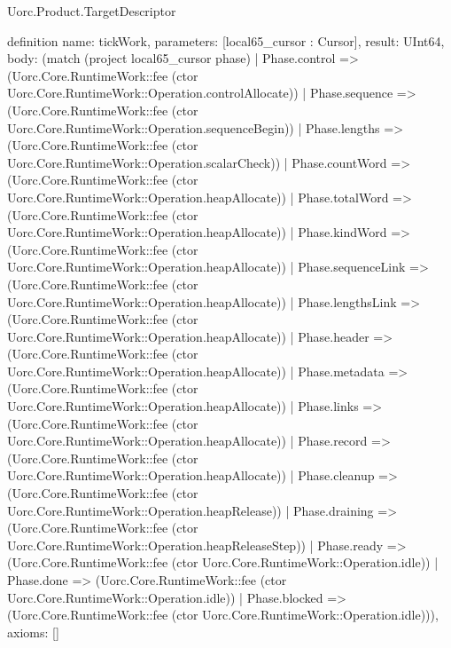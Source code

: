 \begin{lexlean}{Uorc.Product.TargetDescriptor}
\begin{semanticmodule}
definition{
  name: tickWork,
  parameters: [local65_cursor : Cursor],
  result: UInt64,
  body: (match (project local65_cursor phase)
    | Phase.control => (Uorc.Core.RuntimeWork::fee (ctor Uorc.Core.RuntimeWork::Operation.controlAllocate))
    | Phase.sequence => (Uorc.Core.RuntimeWork::fee (ctor Uorc.Core.RuntimeWork::Operation.sequenceBegin))
    | Phase.lengths => (Uorc.Core.RuntimeWork::fee (ctor Uorc.Core.RuntimeWork::Operation.scalarCheck))
    | Phase.countWord => (Uorc.Core.RuntimeWork::fee (ctor Uorc.Core.RuntimeWork::Operation.heapAllocate))
    | Phase.totalWord => (Uorc.Core.RuntimeWork::fee (ctor Uorc.Core.RuntimeWork::Operation.heapAllocate))
    | Phase.kindWord => (Uorc.Core.RuntimeWork::fee (ctor Uorc.Core.RuntimeWork::Operation.heapAllocate))
    | Phase.sequenceLink => (Uorc.Core.RuntimeWork::fee (ctor Uorc.Core.RuntimeWork::Operation.heapAllocate))
    | Phase.lengthsLink => (Uorc.Core.RuntimeWork::fee (ctor Uorc.Core.RuntimeWork::Operation.heapAllocate))
    | Phase.header => (Uorc.Core.RuntimeWork::fee (ctor Uorc.Core.RuntimeWork::Operation.heapAllocate))
    | Phase.metadata => (Uorc.Core.RuntimeWork::fee (ctor Uorc.Core.RuntimeWork::Operation.heapAllocate))
    | Phase.links => (Uorc.Core.RuntimeWork::fee (ctor Uorc.Core.RuntimeWork::Operation.heapAllocate))
    | Phase.record => (Uorc.Core.RuntimeWork::fee (ctor Uorc.Core.RuntimeWork::Operation.heapAllocate))
    | Phase.cleanup => (Uorc.Core.RuntimeWork::fee (ctor Uorc.Core.RuntimeWork::Operation.heapRelease))
    | Phase.draining => (Uorc.Core.RuntimeWork::fee (ctor Uorc.Core.RuntimeWork::Operation.heapReleaseStep))
    | Phase.ready => (Uorc.Core.RuntimeWork::fee (ctor Uorc.Core.RuntimeWork::Operation.idle))
    | Phase.done => (Uorc.Core.RuntimeWork::fee (ctor Uorc.Core.RuntimeWork::Operation.idle))
    | Phase.blocked => (Uorc.Core.RuntimeWork::fee (ctor Uorc.Core.RuntimeWork::Operation.idle))),
  axioms: []
}


\end{semanticmodule}
\end{lexlean}
